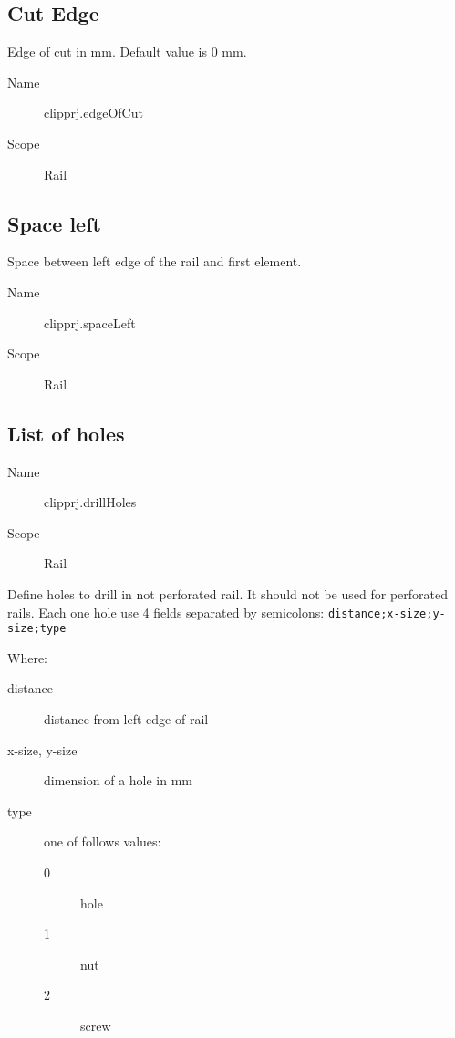 \documentclass[%
	a4paper,
	oneside,
	listof=numbered,
	parskip=half,
	headsepline=true,
	footsepline=false,
	normalheadings,
	0.7headlines,
	headexclude,
	]{scrbook}
\begin{document}
\subsection{Cut Edge}

Edge of cut in mm.
Default value is 0 mm.

\begin{description}
	\item[Name] clipprj.edgeOfCut
	\item[Scope] Rail
\end{description}

\subsection{Space left}

Space between left edge of the rail and first element.

\begin{description}
	\item[Name] clipprj.spaceLeft
	\item[Scope] Rail
\end{description}

\subsection{List of holes}

\begin{description}
	\item[Name] clipprj.drillHoles
	\item[Scope] Rail
\end{description}

Define holes to drill in not perforated rail.
It should not be used for perforated rails.
Each one hole use 4 fields separated by semicolons: \verb|distance;x-size;y-size;type|

Where:

\begin{description}
	\item[distance] distance from left edge of rail
	\item[x-size, y-size] dimension of a hole in mm
	\item[type] one of follows values:
	\begin{description}
		\item[0] hole
		\item[1] nut
		\item[2] screw
	\end{description}
\end{description}
\end{document}
